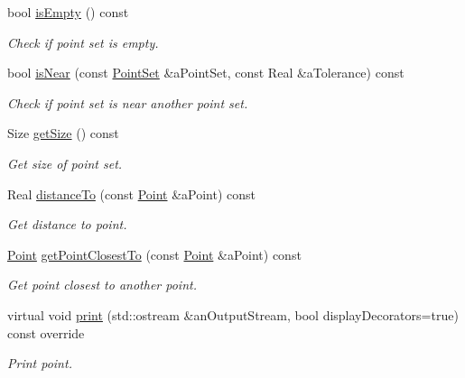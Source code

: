 \begin{DoxyCompactItemize}
bool \hyperlink{classostk_1_1math_1_1geom_1_1d3_1_1objects_1_1_point_set_a107e4bdbcee1586d393d804428889049}{is\+Empty} () const
\begin{DoxyCompactList}\small\item\em Check if point set is empty. \end{DoxyCompactList}\item 
bool \hyperlink{classostk_1_1math_1_1geom_1_1d3_1_1objects_1_1_point_set_a5ee3cc0360a12ff12dc960f6a09aacc2}{is\+Near} (const \hyperlink{classostk_1_1math_1_1geom_1_1d3_1_1objects_1_1_point_set}{Point\+Set} \&a\+Point\+Set, const Real \&a\+Tolerance) const
\begin{DoxyCompactList}\small\item\em Check if point set is near another point set. \end{DoxyCompactList}\item 
Size \hyperlink{classostk_1_1math_1_1geom_1_1d3_1_1objects_1_1_point_set_a8c773ea027260feeb3b24298d075f228}{get\+Size} () const
\begin{DoxyCompactList}\small\item\em Get size of point set. \end{DoxyCompactList}\item 
Real \hyperlink{classostk_1_1math_1_1geom_1_1d3_1_1objects_1_1_point_set_ad46f8b9e6d9f9b256fe1d0104f266968}{distance\+To} (const \hyperlink{classostk_1_1math_1_1geom_1_1d3_1_1objects_1_1_point}{Point} \&a\+Point) const
\begin{DoxyCompactList}\small\item\em Get distance to point. \end{DoxyCompactList}\item 
\hyperlink{classostk_1_1math_1_1geom_1_1d3_1_1objects_1_1_point}{Point} \hyperlink{classostk_1_1math_1_1geom_1_1d3_1_1objects_1_1_point_set_a55f63833c4c6fe3481a4f8833701907a}{get\+Point\+Closest\+To} (const \hyperlink{classostk_1_1math_1_1geom_1_1d3_1_1objects_1_1_point}{Point} \&a\+Point) const
\begin{DoxyCompactList}\small\item\em Get point closest to another point. \end{DoxyCompactList}\item 
virtual void \hyperlink{classostk_1_1math_1_1geom_1_1d3_1_1objects_1_1_point_set_adeeac2042e2e518b51c3b8dc4365c130}{print} (std\+::ostream \&an\+Output\+Stream, bool display\+Decorators=true) const override
\begin{DoxyCompactList}\small\item\em Print point. \end{DoxyCompactList}\item 

\end{DoxyCompactItemize}
